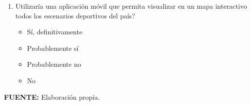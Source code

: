\begin{enumerate}
  \item \textquestiondown Utilizar\'ia una aplicaci\'on m\'ovil que
        permita visualizar en un mapa interactivo todos los escenarios
        deportivos del pa\'is?
        \begin{itemize}
          \item[$\square$] S\'i, definitivamente
          \item[$\square$] Probablemente s\'i
          \item[$\square$] Probablemente no
          \item[$\square$] No
        \end{itemize}
\end{enumerate}

\textbf{FUENTE:} Elaboraci\'on propia.
